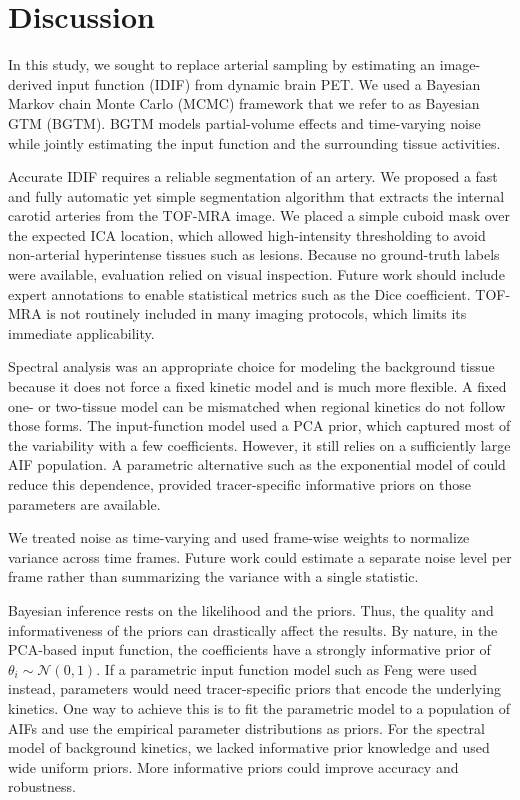 \chapter{Discussion}

In this study, we sought to replace arterial sampling by estimating an image-derived input function (IDIF) from dynamic brain PET.
We used a Bayesian Markov chain Monte Carlo (MCMC) framework that we refer to as Bayesian GTM (BGTM).
BGTM models partial-volume effects and time-varying noise while jointly estimating the input function and the surrounding tissue activities.

Accurate IDIF requires a reliable segmentation of an artery.
We proposed a fast and fully automatic yet simple segmentation algorithm that extracts the internal carotid arteries from the TOF-MRA image.
We placed a simple cuboid mask over the expected ICA location, which allowed high-intensity thresholding to avoid non-arterial hyperintense tissues such as lesions.
Because no ground-truth labels were available, evaluation relied on visual inspection. Future work should include expert annotations to enable statistical metrics such as the Dice coefficient.
TOF-MRA is not routinely included in many imaging protocols, which limits its immediate applicability.

Spectral analysis was an appropriate choice for modeling the background tissue because it does not force a fixed kinetic model and is much more flexible.
A fixed one- or two-tissue model can be mismatched when regional kinetics do not follow those forms.
The input-function model used a PCA prior, which captured most of the variability with a few coefficients.
However, it still relies on a sufficiently large AIF population.
A parametric alternative such as the exponential model of \citeauthor{feng1993models} \cite{feng1993models} could reduce this dependence, provided tracer-specific informative priors on those parameters are available.

We treated noise as time-varying and used frame-wise weights to normalize variance across time frames.
Future work could estimate a separate noise level per frame rather than summarizing the variance with a single statistic.

Bayesian inference rests on the likelihood and the priors.
Thus, the quality and informativeness of the priors can drastically affect the results.
By nature, in the PCA-based input function, the coefficients have a strongly informative prior of \(\theta_i \sim \mathcal{N}(0,1)\).
If a parametric input function model such as Feng were used instead, parameters would need tracer-specific priors that encode the underlying kinetics.
One way to achieve this is to fit the parametric model to a population of AIFs and use the empirical parameter distributions as priors.
For the spectral model of background kinetics, we lacked informative prior knowledge and used wide uniform priors.
More informative priors could improve accuracy and robustness.

